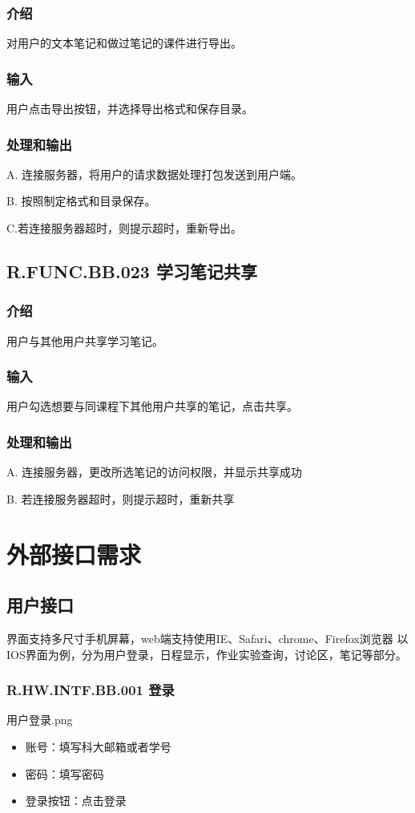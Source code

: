 \begin{enumerate}
    \subsubsection{介绍}
	对用户的文本笔记和做过笔记的课件进行导出。
    \subsubsection{输入}
	用户点击导出按钮，并选择导出格式和保存目录。
    \subsubsection{处理和输出}
	A. 连接服务器，将用户的请求数据处理打包发送到用户端。

	B. 按照制定格式和目录保存。

	C.若连接服务器超时，则提示超时，重新导出。

 \subsection{R.FUNC.BB.023 学习笔记共享}
    \subsubsection{介绍}
	用户与其他用户共享学习笔记。
    \subsubsection{输入}
	用户勾选想要与同课程下其他用户共享的笔记，点击共享。
    \subsubsection{处理和输出}
	A. 连接服务器，更改所选笔记的访问权限，并显示共享成功

	B. 若连接服务器超时，则提示超时，重新共享

\section{外部接口需求}
  \subsection{用户接口}
  界面支持多尺寸手机屏幕，web端支持使用IE、Safari、chrome、Firefox浏览器
以IOS界面为例，分为用户登录，日程显示，作业实验查询，讨论区，笔记等部分。
    \subsubsection{R.HW.INTF.BB.001 登录}
    用户登录.png
    \begin{itemize}
  \item 账号：填写科大邮箱或者学号
  \item 密码：填写密码
  \item 登录按钮：点击登录
  \end{itemize}

\end{enumerate}

